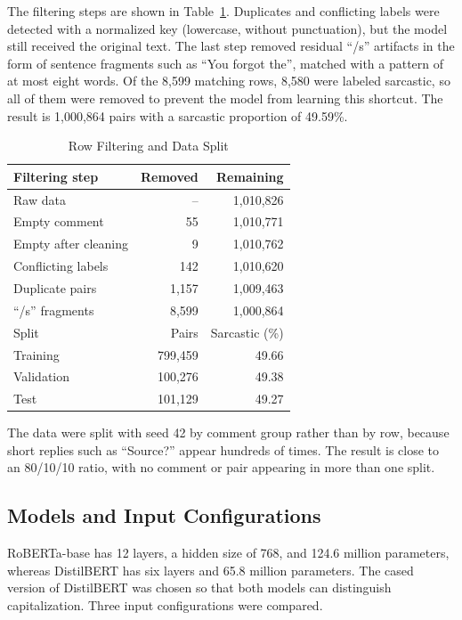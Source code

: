 \documentclass[conference]{IEEEtran}
\begin{document}
The filtering steps are shown in Table~\ref{tab:data}. Duplicates and conflicting labels were detected with a normalized key (lowercase, without punctuation), but the model still received the original text. The last step removed residual ``/s'' artifacts in the form of sentence fragments such as ``You forgot the'', matched with a pattern of at most eight words. Of the 8,599 matching rows, 8,580 were labeled sarcastic, so all of them were removed to prevent the model from learning this shortcut. The result is 1,000,864 pairs with a sarcastic proportion of 49.59\%.

\begin{table}[t]
\caption{Row Filtering and Data Split}
\label{tab:data}
\centering
\begin{tabular}{lrr}
\hline
Filtering step & Removed & Remaining \\
\hline
Raw data & -- & 1,010,826 \\
Empty comment & 55 & 1,010,771 \\
Empty after cleaning & 9 & 1,010,762 \\
Conflicting labels & 142 & 1,010,620 \\
Duplicate pairs & 1,157 & 1,009,463 \\
``/s'' fragments & 8,599 & 1,000,864 \\
\hline
Split & Pairs & Sarcastic (\%) \\
\hline
Training & 799,459 & 49.66 \\
Validation & 100,276 & 49.38 \\
Test & 101,129 & 49.27 \\
\hline
\end{tabular}
\end{table}

The data were split with seed 42 by comment group rather than by row, because short replies such as ``Source?'' appear hundreds of times. The result is close to an 80/10/10 ratio, with no comment or pair appearing in more than one split.

\subsection{Models and Input Configurations}
RoBERTa-base \cite{liu2019roberta} has 12 layers, a hidden size of 768, and 124.6 million parameters, whereas DistilBERT \cite{sanh2019distilbert} has six layers and 65.8 million parameters. The cased version of DistilBERT was chosen so that both models can distinguish capitalization. Three input configurations were compared.
\end{document}
